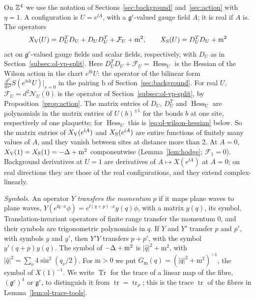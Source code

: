 On $\mathbb Z^4$ we use the notation of Sections~\ref{sec:background} and~\ref{sec:action} with $\eta=1$. A configuration is $U=e^{\ii A}$, with a $\mathfrak g^c$-valued gauge field $A$; it is real if $A$ is. The operators
\[
X_{\rm V}(U)=D_U^TD_U+D_UD_U^T+\mathcal F_U+\mathrm m^2,\qquad X_{\rm S}(U)=D_U^TD_U+\mathrm m^2
\]
act on $\mathfrak g^c$-valued gauge fields and scalar fields, respectively, with $D_U$ as in Section~\ref{subsec:ol-vp-split}. Here $D_U^TD_U+\mathcal F_U=\operatorname{Hess}_U$ is the Hessian of the Wilson action in the chart $e^{\ii h}U$: the operator of the bilinear form $\frac{d^2}{ds^2}S(e^{\ii sh}U)|_{s=0}$ in the pairing $\mathrm b$ of Section~\ref{sec:background}. For real $U$, $\mathcal F_U=d^2\mathcal N_U(0)$ is the operator of Section~\ref{subsec:ol-vp-split}, by Proposition~\ref{prop:action}. The matrix entries of $D_U$, $D_U^T$ and $\operatorname{Hess}_U$ are polynomials in the matrix entries of $U(b)^{\pm1}$ for the bonds $b$ at one site, respectively of one plaquette; for $\operatorname{Hess}_U$ this is \eqref{eq:ol-wilson-hessian} below. So the matrix entries of $X_{\rm V}(e^{\mathrm i A})$ and $X_{\rm S}(e^{\mathrm i A})$ are entire functions of finitely many values of $A$, and they vanish between sites at distance more than $2$. At $A=0$, $X_{\rm V}(1)=X_{\rm S}(1)=-\Delta+\mathrm m^2$ componentwise (Lemma~\ref{lem:hodge}; $\mathcal F_1=0$). Background derivatives at $U=1$ are derivatives of $A\mapsto X(e^{\ii A})$ at $A=0$; on real directions they are those of the real configurations, and they extend complex-linearly.

\emph{Symbols.} An operator $Y$ \emph{transfers the momentum} $p$ if it maps plane waves to plane waves, $Y(e^{\ii q\cdot x}\phi)=e^{\ii(q+p)\cdot x}y(q)\phi$, with a matrix $y(q)$, its symbol. Translation-invariant operators of finite range transfer the momentum $0$, and their symbols are trigonometric polynomials in $q$. If $Y$ and $Y'$ transfer $p$ and $p'$, with symbols $y$ and $y'$, then $Y'Y$ transfers $p+p'$, with the symbol $y'(q+p)y(q)$. The symbol of $-\Delta+\mathrm m^2$ is $|\hat q|^2+\mathrm m^2$, with $|\hat q|^2=\sum_\nu4\sin^2(q_\nu/2)$. For $\mathrm m>0$ we put $G_{\mathrm m}(q)=(|\hat q|^2+\mathrm m^2)^{-1}$, the symbol of $X(1)^{-1}$. We write $\operatorname{Tr}$ for the trace of a linear map of the fibre, $(\mathfrak g^c)^4$ or $\mathfrak g^c$, to distinguish it from $\operatorname{tr}=\operatorname{tr}_\rho$; this is the trace $\operatorname{tr}$ of the fibres in Lemma~\ref{lem:ol-trace-tools}.

